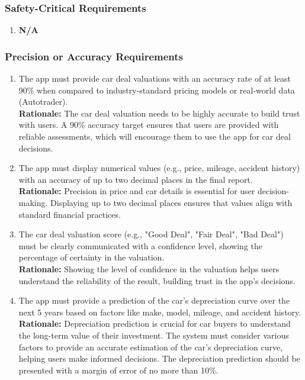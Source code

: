 \documentclass[]{article}
\begin{document}
\subsubsection{Safety-Critical Requirements}
\label{ssub:safety_critical_requirements}
\begin{enumerate}[{PR-SC}1.]
    \item \textbf{N/A}
\end{enumerate}

\subsubsection{Precision or Accuracy Requirements}
\label{ssub:precision_or_accuracy_requirements}
\begin{enumerate}[{PR-PA}1.]
    \item The app must provide car deal valuations with an accuracy rate of at least 90\% when compared to industry-standard pricing models or real-world data (Autotrader). \\ 
    \textbf{Rationale:} The car deal valuation needs to be highly accurate to build trust with users. A 90\% accuracy target ensures that users are provided with reliable assessments, which will encourage them to use the app for car deal decisions.

    \item The app must display numerical values (e.g., price, mileage, accident history) with an accuracy of up to two decimal places in the final report.  \\
    \textbf{Rationale:} Precision in price and car details is essential for user decision-making. Displaying up to two decimal places ensures that values align with standard financial practices.

    \item The car deal valuation score (e.g., "Good Deal", "Fair Deal", "Bad Deal") must be clearly communicated with a confidence level, showing the percentage of certainty in the valuation.  \\
    \textbf{Rationale:} Showing the level of confidence in the valuation helps users understand the reliability of the result, building trust in the app's decisions.

    \item The app must provide a prediction of the car's depreciation curve over the next 5 years based on factors like make, model, mileage, and accident history.  \\
    \textbf{Rationale:} Depreciation prediction is crucial for car buyers to understand the long-term value of their investment. The system must consider various factors to provide an accurate estimation of the car's depreciation curve, helping users make informed decisions. The depreciation prediction should be presented with a margin of error of no more than 10\%.
\end{enumerate}
\end{document}
